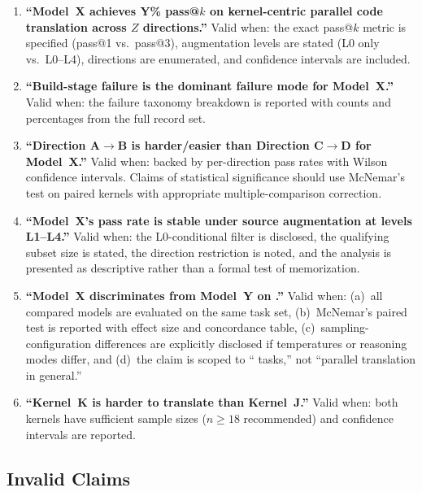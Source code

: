 \begin{enumerate}
  \item \textbf{``Model~X achieves Y\% pass@$k$ on kernel-centric parallel
    code translation across $Z$ directions.''} Valid when: the exact pass@$k$
    metric is specified (pass@1 vs.\ pass@3), augmentation levels are stated
    (L0 only vs.\ L0--L4), directions are enumerated, and confidence intervals
    are included.

  \item \textbf{``Build-stage failure is the dominant failure mode for
    Model~X.''} Valid when: the failure taxonomy breakdown is reported with
    counts and percentages from the full record set.

  \item \textbf{``Direction A$\to$B is harder/easier than Direction C$\to$D
    for Model~X.''} Valid when: backed by per-direction pass rates with Wilson
    confidence intervals. Claims of statistical significance should use
    McNemar's test on paired kernels with appropriate multiple-comparison
    correction.

  \item \textbf{``Model~X's pass rate is stable under source augmentation at
    levels L1--L4.''} Valid when: the L0-conditional filter is disclosed, the
    qualifying subset size is stated, the direction restriction is noted, and
    the analysis is presented as descriptive rather than a formal test of
    memorization.

  \item \textbf{``Model~X discriminates from Model~Y on \parbench{}.''} Valid
    when: (a)~all compared models are evaluated on the same task set, (b)~McNemar's
    paired test is reported with effect size and concordance table,
    (c)~sampling-configuration differences are explicitly disclosed if
    temperatures or reasoning modes differ, and (d)~the claim is scoped to
    ``\parbench{} tasks,'' not ``parallel translation in general.''

  \item \textbf{``Kernel~K is harder to translate than Kernel~J.''} Valid
    when: both kernels have sufficient sample sizes ($n \geq 18$ recommended)
    and confidence intervals are reported.
\end{enumerate}

\subsection{Invalid Claims}
\label{sec:ec-invalid}

